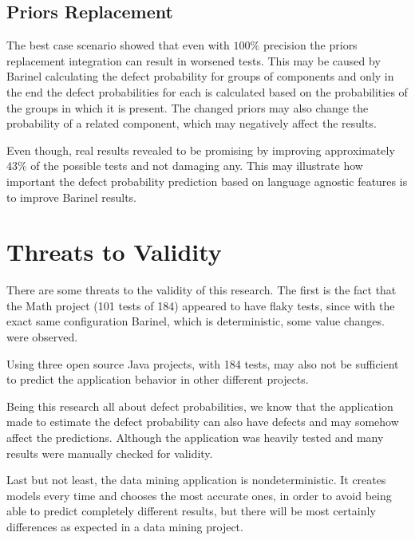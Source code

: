 \subsection{Priors Replacement}

The best case scenario showed that even with $100\%$ precision the priors replacement integration can result in worsened tests. This may be caused by Barinel calculating the defect probability for groups of components and only in the end the defect probabilities for each is calculated based on the probabilities of the groups in which it is present. The changed priors may also change the probability of a related component, which may negatively affect the results.

Even though, real results revealed to be promising by improving approximately $43\%$ of the possible tests and not damaging any. This may illustrate how important the defect probability prediction based on language agnostic features is to improve Barinel results.

\section{Threats to Validity}

There are some threats to the validity of this research. The first is the fact that the Math project (101 tests of 184) appeared to have flaky tests, since with the exact same configuration Barinel, which is deterministic, some value changes. were observed. 

Using three open source Java projects, with 184 tests, may also not be sufficient to predict the application behavior in other different projects.

Being this research all about defect probabilities, we know that the application made to estimate the defect probability can also have defects and may somehow affect the predictions. Although the application was heavily tested and many results were manually checked for validity.

Last but not least, the data mining application is nondeterministic. It creates models every time and chooses the most accurate ones, in order to avoid being able to predict completely different results, but there will be most certainly differences as expected in a data mining project.

